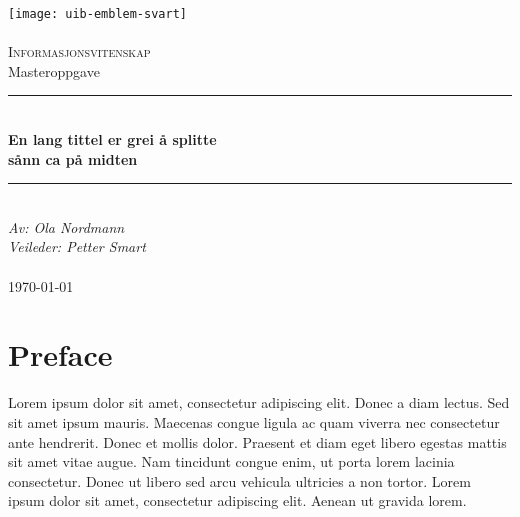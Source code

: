 \documentclass[12pt]{article}
\renewcommand{\maketitle}{}
\begin{document}
\maketitle

\newcommand{\blankpage}{\newpage{}\thispagestyle{empty}\mbox{}\newpage{}}
\newcommand{\HRule}{\rule{\linewidth}{0.5mm}}

\begin{titlepage}
\begin{center}
\texttt{[image: uib-emblem-svart]} \\[0.5cm]
\paragraph*{}

\textsc{\Large Informasjonsvitenskap}\\[0.5cm]
\Large Masteroppgave \\[0.4cm]
\HRule \\[0.4cm]
{ \huge \bfseries En lang tittel er grei å splitte  \\ sånn ca på midten}\\[0.5cm]
\HRule \\[1.0cm]

\emph{Av: Ola Nordmann}\\
\emph{Veileder: Petter Smart}\\

\paragraph*{}
\end{center}
\vfill
\begin{center}
{\large \today}
\end{center}
\end{titlepage}

\blankpage

\section*{Preface}
Lorem ipsum dolor sit amet, consectetur adipiscing elit. Donec a diam lectus. Sed sit amet ipsum mauris. Maecenas congue ligula ac quam viverra nec consectetur ante hendrerit. Donec et mollis dolor. Praesent et diam eget libero egestas mattis sit amet vitae augue. Nam tincidunt congue enim, ut porta lorem lacinia consectetur. Donec ut libero sed arcu vehicula ultricies a non tortor. Lorem ipsum dolor sit amet, consectetur adipiscing elit. Aenean ut gravida lorem.
\end{document}
